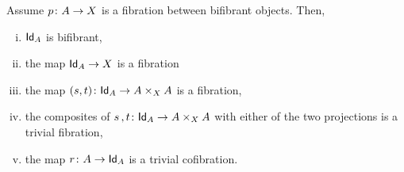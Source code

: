 \documentclass[reqno,10pt,a4paper,oneside,draft]{amsart}
\begin{document}
\begin{proposition}
\label{proposition:MainPathObject}
Assume $p \colon A \rightarrow X $ is a fibration between bifibrant objects. Then,
\begin{enumerate}[(i)] 
\item $\mathsf{Id}_A$ is bifibrant, 
\item the map $\mathsf{Id}_A \rightarrow X$ is a fibration
\item the map $(s, t) \colon \mathsf{Id}_A \rightarrow A \times_{X} A$ is a fibration,
\item the composites of $s \, , t \colon \mathsf{Id}_A \rightarrow A \times_{X} A$  with either of the two projections is a trivial fibration,
\item the map $r \colon A \rightarrow \mathsf{Id}_A$ is a trivial cofibration.
\end{enumerate}
\end{proposition}
\end{document}
